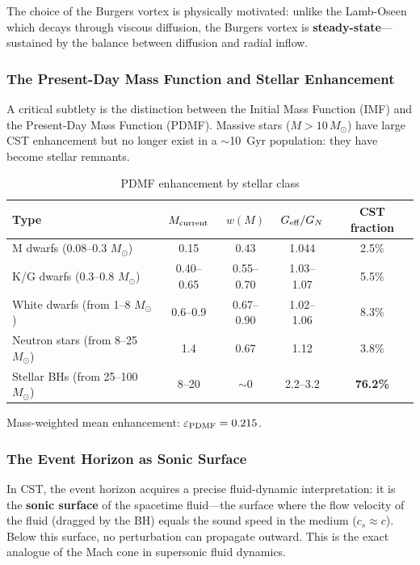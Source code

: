 \documentclass[10pt,a4paper]{article}
\begin{document}
The choice of the Burgers vortex is physically motivated: unlike the Lamb-Oseen which decays through viscous diffusion, the Burgers vortex is \textbf{steady-state}---sustained by the balance between diffusion and radial inflow.

\subsubsection{The Present-Day Mass Function and Stellar Enhancement}

A critical subtlety is the distinction between the Initial Mass Function (IMF) and the Present-Day Mass Function (PDMF). Massive stars ($M > 10\,M_\odot$) have large CST enhancement but no longer exist in a $\sim$10~Gyr population: they have become stellar remnants.

\begin{table}[h]
\centering
\caption{PDMF enhancement by stellar class}
\begin{tabular}{lcccc}
\toprule
Type & $M_{\rm current}$ & $w(M)$ & $G_{\rm eff}/G_N$ & CST fraction \\
\midrule
M dwarfs (0.08--0.3 $M_\odot$) & 0.15 & 0.43 & 1.044 & 2.5\% \\
K/G dwarfs (0.3--0.8 $M_\odot$) & 0.40--0.65 & 0.55--0.70 & 1.03--1.07 & 5.5\% \\
White dwarfs (from 1--8 $M_\odot$) & 0.6--0.9 & 0.67--0.90 & 1.02--1.06 & 8.3\% \\
Neutron stars (from 8--25 $M_\odot$) & 1.4 & 0.67 & 1.12 & 3.8\% \\
Stellar BHs (from 25--100 $M_\odot$) & 8--20 & $\sim$0 & 2.2--3.2 & \textbf{76.2\%} \\
\bottomrule
\end{tabular}
\end{table}

Mass-weighted mean enhancement: $\varepsilon_{\rm PDMF} = 0.215$.

\subsubsection{The Event Horizon as Sonic Surface}

In CST, the event horizon acquires a precise fluid-dynamic interpretation: it is the \textbf{sonic surface} of the spacetime fluid---the surface where the flow velocity of the fluid (dragged by the BH) equals the sound speed in the medium ($c_s \approx c$). Below this surface, no perturbation can propagate outward. This is the exact analogue of the Mach cone in supersonic fluid dynamics.
\end{document}
